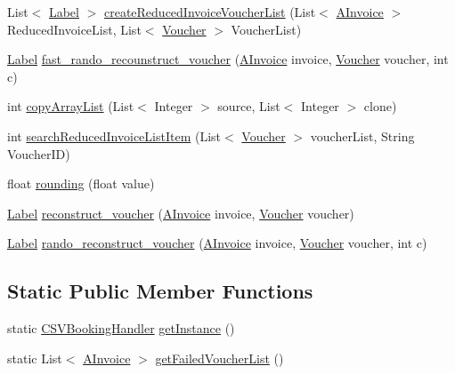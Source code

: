 \begin{DoxyCompactItemize}
\item 
List$<$ \hyperlink{class_booking_1_1_label}{Label} $>$ \hyperlink{class_booking_1_1_c_s_v_booking_handler_a9766d7d29aeb5b2fbf6a70616e0bcd15}{create\+Reduced\+Invoice\+Voucher\+List} (List$<$ \hyperlink{class_reduced_invoice_1_1_a_invoice}{A\+Invoice} $>$ Reduced\+Invoice\+List, List$<$ \hyperlink{class_booking_1_1_voucher}{Voucher} $>$ Voucher\+List)
\item 
\hyperlink{class_booking_1_1_label}{Label} \hyperlink{class_booking_1_1_c_s_v_booking_handler_a2df02bd1c70d30d48a113aadc025fece}{fast\+\_\+rando\+\_\+recounstruct\+\_\+voucher} (\hyperlink{class_reduced_invoice_1_1_a_invoice}{A\+Invoice} invoice, \hyperlink{class_booking_1_1_voucher}{Voucher} voucher, int c)
\item 
int \hyperlink{class_booking_1_1_c_s_v_booking_handler_afdcd7e2d786948b378e23ea65dce0be2}{copy\+Array\+List} (List$<$ Integer $>$ source, List$<$ Integer $>$ clone)
\item 
int \hyperlink{class_booking_1_1_c_s_v_booking_handler_a9748f34b648b985b61b702176a9d509f}{search\+Reduced\+Invoice\+List\+Item} (List$<$ \hyperlink{class_booking_1_1_voucher}{Voucher} $>$ voucher\+List, String Voucher\+ID)
\item 
float \hyperlink{class_booking_1_1_c_s_v_booking_handler_acbde555759b0d5d7b8dd07b6da253083}{rounding} (float value)
\item 
\hyperlink{class_booking_1_1_label}{Label} \hyperlink{class_booking_1_1_c_s_v_booking_handler_ab783364b26723a898cf9cd8f339416a9}{reconstruct\+\_\+voucher} (\hyperlink{class_reduced_invoice_1_1_a_invoice}{A\+Invoice} invoice, \hyperlink{class_booking_1_1_voucher}{Voucher} voucher)
\item 
\hyperlink{class_booking_1_1_label}{Label} \hyperlink{class_booking_1_1_c_s_v_booking_handler_a70179f1ecdc401d5ea5aa612541acd9b}{rando\+\_\+reconstruct\+\_\+voucher} (\hyperlink{class_reduced_invoice_1_1_a_invoice}{A\+Invoice} invoice, \hyperlink{class_booking_1_1_voucher}{Voucher} voucher, int c)
\end{DoxyCompactItemize}
\subsection*{Static Public Member Functions}
\begin{DoxyCompactItemize}
\item 
static \hyperlink{class_booking_1_1_c_s_v_booking_handler}{C\+S\+V\+Booking\+Handler} \hyperlink{class_booking_1_1_c_s_v_booking_handler_a7b9f19a1917141d43d2eadf01f4c51e8}{get\+Instance} ()
\item 
static List$<$ \hyperlink{class_reduced_invoice_1_1_a_invoice}{A\+Invoice} $>$ \hyperlink{class_booking_1_1_c_s_v_booking_handler_aad41d29904adc3b78ad132e6ba6ee9df}{get\+Failed\+Voucher\+List} ()
\end{DoxyCompactItemize}


